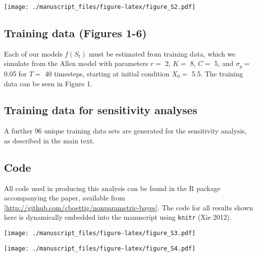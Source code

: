 \documentclass[]{components/elsarticle}
\begin{document}
\texttt{[image: ./manuscript\_files/figure-latex/figure\_S2.pdf]}

\newpage

\subsection{Training data (Figures
1-6)}\label{training-data-figures-1-6}

Each of our models $f(S_t)$ must be estimated from training data, which
we simulate from the Allen model with parameters $r = $ 2, $K =$ 8,
$C =$ 5, and $\sigma_g =$ 0.05 for $T=$ 40 timesteps, starting at
initial condition $X_0 = $ 5.5. The training data can be seen in Figure
1.

\subsection{Training data for sensitivity
analyses}\label{training-data-for-sensitivity-analyses}

A further 96 unique training data sets are generated for the sensitivity
analysis, as described in the main text.

\subsection{Code}\label{code}

All code used in producing this analysis can be found in the R package
accompanying the paper, available from
{[}\url{http://github.com/cboettig/nonparametric-bayes}{]}. The code for
all results shown here is dynamically embedded into the manuscript using
\texttt{knitr} (Xie 2012).

\texttt{[image: ./manuscript\_files/figure-latex/figure\_S3.pdf]}

\texttt{[image: ./manuscript\_files/figure-latex/figure\_S4.pdf]}
\end{document}
